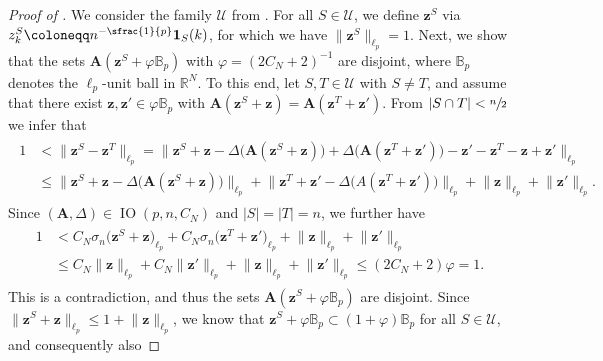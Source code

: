 \documentclass[11pt,reqno, a4paper]{article}
\numberwithin{equation}{section}
\begin{document}
\begin{proof}[Proof of ]
We consider the family $\mathcal{U}$ from .
For all $S\in\mathcal{U}$, we define $\mathbf{z}^S$ via $z^S_k\coloneqq n^{-\sfrac{1}{p}}\boldsymbol{1}_S(k)$, for which we have $\lVert\mathbf{z}^S\rVert_{\ell_p}=1$.
Next, we show that the sets $\mathbf{A}(\mathbf{z}^S+\varphi\mathbb{B}_p)$ with $\varphi=(2C_N+2)^{-1}$ are disjoint, where $\mathbb{B}_p$ denotes the $\ell_p$-unit ball in $\mathbb{R}^N$. To this end, let $S,T\in\mathcal{U}$ with $S\neq T$, and assume that there exist $\mathbf{z},\mathbf{z}'\in\varphi\mathbb{B}_{p}$ with $\mathbf{A}(\mathbf{z}^S+\mathbf{z})=\mathbf{A}(\mathbf{z}^T+\mathbf{z}')$.
From $\lvert S\cap T\rvert<\sfrac{n}{2}$ we infer that
\begin{align}
\begin{split}
1& < \bigl\lVert \mathbf{z}^S -\mathbf{z}^T \bigr\rVert_{\ell_p}=\bigl\lVert\mathbf{z}^S + \mathbf{z} - \Delta\bigl(\mathbf{A}(\mathbf{z}^S+\mathbf{z})\bigr)+\Delta\bigl(\mathbf{A}(\mathbf{z}^T+\mathbf{z}')\bigr) -\mathbf{z}'-\mathbf{z}^T-\mathbf{z}+\mathbf{z}'\bigr\rVert_{\ell_p}\\
&\leq\big\lVert\mathbf{z}^S+\mathbf{z}-\Delta\bigl(\mathbf{A}(\mathbf{z}^S+\mathbf{z})\bigr)\big\rVert_{\ell_p} + \big\lVert\mathbf{z}^T+\mathbf{z}'-\Delta\bigl(A(\mathbf{z}^T+\mathbf{z}')\bigr)\big\rVert_{\ell_p}+ \lVert\mathbf{z}\rVert_{\ell_p} + \lVert\mathbf{z}'\rVert_{\ell_p}.
\end{split}
\end{align}
Since $(\mathbf{A},\Delta) \in\operatorname{IO}(p,n,C_N)$ and $\vert S \vert = \vert T \vert = n$, we further have
\begin{align}
\begin{split}
1 & < C_N\sigma_n\big(\mathbf{z}^S + \mathbf{z}\big)_{\ell_p} + C_N\sigma_n \big(\mathbf{z}^T + \mathbf{z}'\big)_{\ell_p} + \lVert \mathbf{z} \rVert_{\ell_p} + \lVert \mathbf{z}' \rVert_{\ell_p}\\
&\leq C_N \lVert\mathbf{z} \rVert_{\ell_p}+C_N \lVert \mathbf{z}' \rVert_{\ell_p} + \lVert \mathbf{z} \rVert_{\ell_p}+ \lVert \mathbf{z}' \rVert_{\ell_p} \leq (2C_N+2)\varphi=1.
\end{split}
\end{align}
This is a contradiction, and thus the sets $\mathbf{A}(\mathbf{z}^S+\varphi\mathbb{B}_{p})$ are disjoint. Since $\lVert\mathbf{z}^S+\mathbf{z}\rVert_{\ell_p} \leq 1 + \lVert\mathbf{z}\rVert_{\ell_p}$, we know that $\mathbf{z}^S+\varphi\mathbb{B}_{p}\subset\left(1+\varphi\right)\mathbb{B}_{p}$ for all $S\in\mathcal{U}$, and consequently also

\end{proof}
\end{document}
